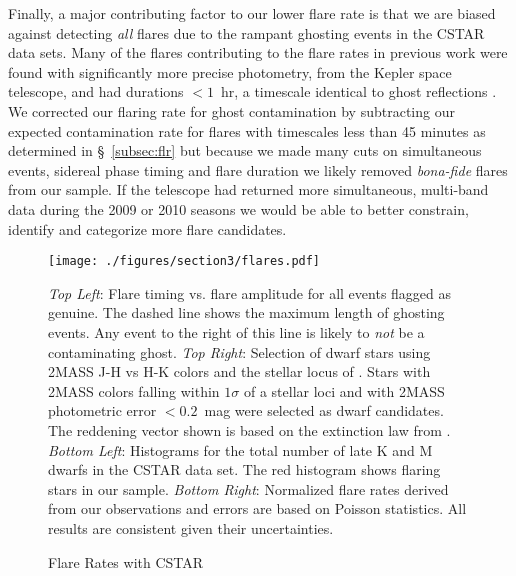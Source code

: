 Finally, a major contributing factor to our lower flare rate is that we are biased against detecting \textit{all} flares due to the rampant ghosting events in the CSTAR data sets. Many of the flares contributing to the flare rates in previous work were found with significantly more precise photometry, from the Kepler space telescope, and had durations $<1$~hr, a timescale identical to ghost reflections \citep{Hawley2014, Davenport2014, Lurie2015}. We corrected our flaring rate for ghost contamination by subtracting our expected contamination rate for flares with timescales less than 45 minutes as determined in \S~\ref{subsec:flr} but because we made many cuts on simultaneous events, sidereal phase timing and flare duration we likely removed \textit{bona-fide} flares from our sample. If the telescope had returned more simultaneous, multi-band data during the 2009 or 2010 seasons we would be able to better constrain, identify and categorize more flare candidates.



\begin{figure}[H]
\begin{center}
\singlespace
\texttt{[image: ./figures/section3/flares.pdf]}
\end{center}
\singlespace
\caption{Flare Rates with CSTAR}   \textit{Top Left}: Flare timing vs. flare amplitude for all events flagged as genuine. The dashed line shows the maximum length of ghosting events. Any event to the right of this line is likely to \textit{not} be a contaminating ghost. \textit{Top Right}: Selection of dwarf stars using 2MASS J-H vs H-K colors and the stellar locus of \citet{Pecaut2013}. Stars with 2MASS colors falling within $1\sigma$ of a stellar loci and with 2MASS photometric error $<0.2$~mag were selected as dwarf candidates. The reddening vector shown is based on the extinction law from \citet{Fitzpatrick1999}. \textit{Bottom Left}: Histograms for the total number of late K and M dwarfs in the CSTAR data set. The red histogram shows flaring stars in our sample. \textit{Bottom Right}: Normalized flare rates derived from our observations and errors are based on Poisson statistics. All results are consistent given their uncertainties. \label{fig:rate}
\end{figure}

